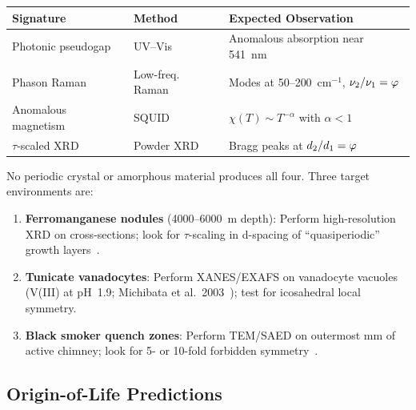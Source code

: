 \begin{center}
\begin{tabular}{@{}llp{5.5cm}@{}}
\toprule
\textbf{Signature} & \textbf{Method} & \textbf{Expected Observation} \\
\midrule
Photonic pseudogap & UV--Vis & Anomalous absorption near 541~nm \\
Phason Raman & Low-freq. Raman & Modes at 50--200~cm$^{-1}$, $\nu_2/\nu_1 = \varphi$ \\
Anomalous magnetism & SQUID & $\chi(T) \sim T^{-\alpha}$ with $\alpha < 1$ \\
$\tau$-scaled XRD & Powder XRD & Bragg peaks at $d_2/d_1 = \varphi$ \\
\bottomrule
\end{tabular}
\end{center}

\noindent No periodic crystal or amorphous material produces all four. Three target environments are:
\begin{enumerate}[noitemsep]
    \item \textbf{Ferromanganese nodules} (4000--6000~m depth): Perform high-resolution XRD on cross-sections; look for $\tau$-scaling in d-spacing of ``quasiperiodic'' growth layers~\cite{Hein00}.
    \item \textbf{Tunicate vanadocytes}: Perform XANES/EXAFS on vanadocyte vacuoles (V(III) at pH~1.9; Michibata et al.\ 2003~\cite{Michibata03}); test for icosahedral local symmetry.
    \item \textbf{Black smoker quench zones}: Perform TEM/SAED on outermost mm of active chimney; look for 5- or 10-fold forbidden symmetry~\cite{BindiSteinhardt09}.
\end{enumerate}

\subsection{Origin-of-Life Predictions}

